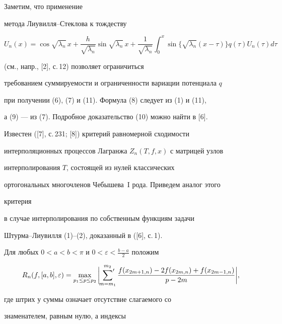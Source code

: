 Заметим, что применение 


метода Ли\-у\-вил\-ля--Стеклова к тождеству 


$$ 


U_n(x)=\cos\sqrt{\lambda_n}\,x+ 


\frac{h}{\sqrt{\lambda_n}}\sin\sqrt{\lambda_n}\,x+ 


\frac{1}{\sqrt{\lambda_n}}\int^x_0 


\sin\{\sqrt{\lambda_n}(x-\tau)\}q(\tau)U_n(\tau)d\tau 


$$ 


(см., напр., [2], с.\,12) позволяет ограничиться 


требованием суммируемости и ограниченности вариации потенциала $q$ 


при получении (6), (7) и (11). Формула (8) следует из (1) и (11), 


а (9) --- из (7). Подробное доказательство (10) можно найти в [6]. 


 


Известен ([7], с.\,231; [8]) критерий равномерной сходимости 


интерполяционных процессов Лагранжа $Z_n(T,f,x)$ с матрицей узлов 


интерполирования $T$, состоящей из нулей классических 


ортогональных многочленов Чебышева~I рода. Приведем аналог этого 


критерия 


в случае интерполирования по собственным функциям задачи 


Штурма--Лиувилля (1)--(2), доказанный в ([6], с.\,1). 


 


Для любых $0<a<b<\pi$ и $0<\varepsilon<\frac{b-a}{2}$ положим 


\begin{equation} 


R_n(f,[a,b],\varepsilon)=\max_{p_1\le p\le p_2} 


\bigg|\sideset{}{'}\sum^{m_2}_{m=m_1} 


\frac{f(x_{2m+1,n})-2f(x_{2m,n})+f(x_{2m-1,n})}{p-2m}\bigg|, 


\end{equation} 


где штрих у суммы означает отсутствие слагаемого со 


знаменателем, равным нулю, а индексы 


